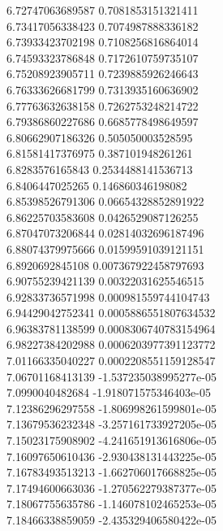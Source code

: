 {6.72747063689587 0.7081853151321411 \\
6.73417056338423 0.7074987888336182 \\
6.73933423702198 0.7108256816864014 \\
6.74593323786848 0.7172610759735107 \\
6.75208923905711 0.7239885926246643 \\
6.76333626681799 0.7313935160636902 \\
6.77763632638158 0.7262753248214722 \\
6.79386860227686 0.6685778498649597 \\
6.80662907186326 0.505050003528595 \\
6.81581417376975 0.387101948261261 \\
6.8283576165843 0.2534488141536713 \\
6.8406447025265 0.146860346198082 \\
6.85398526791306 0.06654328852891922 \\
6.86225703583608 0.0426529087126255 \\
6.87047073206844 0.02814032696187496 \\
6.88074379975666 0.01599591039121151 \\
6.8920692845108 0.007367922458797693 \\
6.90755239421139 0.00322031625546515 \\
6.92833736571998 0.000981559744104743 \\
6.94429042752341 0.0005886551807634532 \\
6.96383781138599 0.0008306740783154964 \\
6.98227384202988 0.0006203977391123772 \\
7.01166335040227 0.0002208551159128547 \\
7.06701168413139 -1.537235038995277e-05 \\
7.0990040482684 -1.918071575346403e-05 \\
7.12386296297558 -1.806998261599801e-05 \\
7.13679536232348 -3.257161733927205e-05 \\
7.15023175908902 -4.241651913616806e-05 \\
7.16097650610436 -2.930438131443225e-05 \\
7.16783493513213 -1.662706017668825e-05 \\
7.17494600663036 -1.270562279387377e-05 \\
7.18067755635786 -1.146078102465253e-05 \\
7.18466338859059 -2.435329406580422e-05 \\
}
